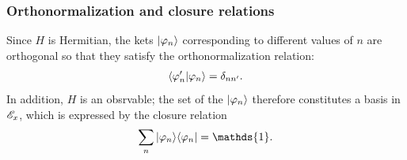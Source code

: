 \subsubsection{Orthonormalization and closure relations}
Since $H$ is Hermitian, the kets $|\varphi_n\rangle$ corresponding to different values of $n$ are orthogonal so that they satisfy the orthonormalization relation:
\begin{align*}
    \langle\varphi_n'|\varphi_n\rangle=\delta_{nn'}.
\end{align*}
In addition, $H$ is an obsrvable; the set of the $|\varphi_n\rangle$ therefore constitutes a basis in $\mathscr{E}_x$, which is expressed by the closure relation
\begin{align*}
    \sum_n\ket{\varphi_n}\bra{\varphi_n}=\mathds{1}.
\end{align*}

%
